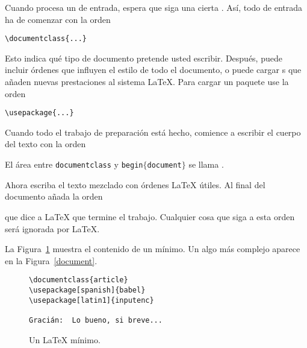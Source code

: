 Cuando \LaTeXe{} procesa un \filenomo{} de entrada, espera que siga una cierta .  Así, todo \filenomo{} de entrada ha de comenzar con la orden
\begin{code}
\verb|\documentclass{...}|
\end{code}
Esto indica qué tipo de documento pretende usted escribir.  Después, puede incluir órdenes que influyen el estilo de todo el documento, o puede cargar s que añaden nuevas prestaciones al sistema \LaTeX{}.  Para cargar un paquete use la orden
\begin{code}
\verb|\usepackage{...}|
\end{code}

Cuando todo el trabajo de preparación está hecho, comience a escribir el cuerpo del texto con la orden

\begin{code}
\verb||
\end{code}

El área entre \texttt{\bs documentclass} y \texttt{\bs begin$\mathtt{\{}$document$\mathtt{\}}$} se llama \emph{}.

Ahora escriba el texto mezclado con órdenes \LaTeX{} útiles.  Al final del documento añada la orden
\begin{code}
\verb||
\end{code}
que dice a \LaTeX{} que termine el trabajo.  Cualquier cosa que siga a esta orden será ignorada por \LaTeX.

La Figura~\ref{mini} muestra el contenido de un \filenomo{} \LaTeXe{} mínimo.  Un  algo más complejo aparece en la Figura~\ref{document}.

\begin{figure}[!bp]
\begin{lined}{7cm}
\begin{verbatim}
\documentclass{article}
\usepackage[spanish]{babel}
\usepackage[latin1]{inputenc}

Gracián:  Lo bueno, si breve...

\end{verbatim}
\end{lined}
\caption{Un \filenomo{} \LaTeX{} mínimo.} \label{mini}
\end{figure}
 
